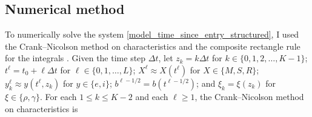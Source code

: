 \documentclass[USenglish]{article}
\begin{document}
\subsection{Numerical method}

To numerically solve the system
\eqref{model_time_since_entry_structured}, I used the Crank--Nicolson
method on characteristics and the composite rectangle rule for the
integrals \autocite{milner_1992}.  Given the time step $\Delta t$,
let $z_k = k \Delta t$
for $k \in \{0, 1, 2, \ldots, K - 1\}$;
$t^{\ell} = t_0 + \ell \Delta t$
for $\ell \in \{0, 1, \ldots, L\}$;
$X^{\ell} \approx X(t^{\ell})$
for $X \in \{M, S, R\}$;
$y_k^{\ell} \approx y(t^{\ell}, z_k)$
for $y \in \{e, i\}$;
$b^{\ell - 1 / 2} = b(t^{\ell - 1 / 2})$;
and $\xi_k = \xi(z_k)$
for $\xi \in \{\rho, \gamma\}$.
For each $1 \leq k \leq K - 2$
and each $\ell \geq 1$,
the Crank--Nicolson method on characteristics is
\end{document}
